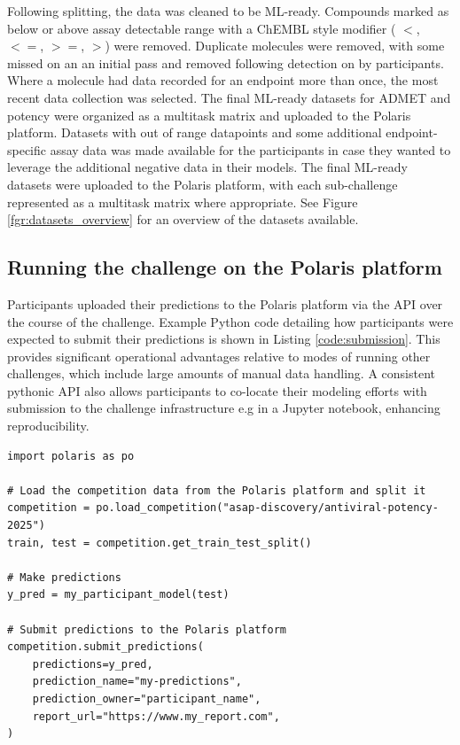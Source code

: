 \documentclass[journal=jcim,manuscript=article]{achemso}
\newenvironment{code}{\captionsetup{type=listing}}{}
\begin{document}
Following splitting, the data was cleaned to be ML-ready. Compounds marked as below or above assay detectable range with a ChEMBL style modifier ( $<$, $<=$, $>=$, $>$) were removed. Duplicate molecules were removed, with some missed on an an initial pass and removed following detection on by participants. Where a molecule had data recorded for an endpoint more than once, the most recent data collection was selected. The final ML-ready datasets for ADMET and potency were organized as a multitask matrix and uploaded to the Polaris platform. Datasets with out of range datapoints and some additional endpoint-specific assay data was made available for the participants in case they wanted to leverage the additional negative data in their models. The final ML-ready datasets were uploaded to the Polaris platform, with each sub-challenge represented as a multitask matrix where appropriate. See Figure \ref{fgr:datasets_overview} for an overview of the datasets available. 


\subsection{Running the challenge on the Polaris platform}

Participants uploaded their predictions to the Polaris platform via the API over the course of the challenge. Example Python code detailing how participants were expected to submit their predictions is shown in Listing \ref{code:submission}. This provides significant operational advantages relative to modes of running other challenges, which include large amounts of manual data handling. A consistent pythonic API also allows participants to co-locate their modeling efforts with submission to the challenge infrastructure e.g in a Jupyter notebook, enhancing reproducibility.

\begin{code}
\label{code:submission}
\begin{verbatim}
import polaris as po

# Load the competition data from the Polaris platform and split it
competition = po.load_competition("asap-discovery/antiviral-potency-2025")
train, test = competition.get_train_test_split()

# Make predictions
y_pred = my_participant_model(test)

# Submit predictions to the Polaris platform
competition.submit_predictions(
    predictions=y_pred,
    prediction_name="my-predictions",
    prediction_owner="participant_name",
    report_url="https://www.my_report.com",
)
\end{verbatim}
\end{code}
\end{document}
